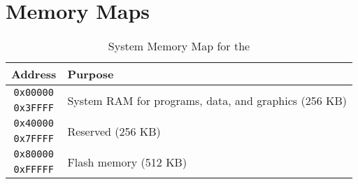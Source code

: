 \chapter{Memory Maps}

\begin{table}
    \begin{center}
        \begin{tabular}{|c|l|} \hline
            Address & Purpose \\ \hline\hline
            \verb+0x00000+ & \multirow{2}{*}{System RAM for programs, data, and graphics (256 KB)} \\ \cline{1-1}
            \verb+0x3FFFF+ & \\ \hline
            \verb+0x40000+ & \multirow{2}{*}{Reserved (256 KB)} \\ \cline{1-1}
            \verb+0x7FFFF+ & \\ \hline
            \verb+0x80000+ & \multirow{2}{*}{Flash memory (512 KB)} \\ \cline{1-1}
            \verb+0xFFFFF+ & \\ \hline
        \end{tabular}
    \end{center}
    \caption{System Memory Map for the \jr}
    \label{tab:sys_mem_map}
\end{table}

